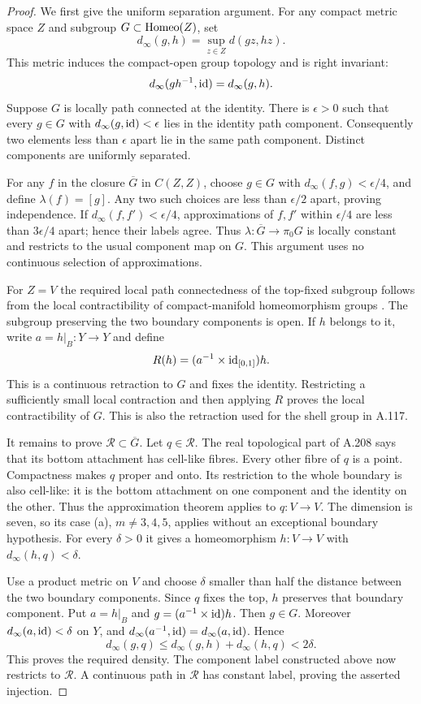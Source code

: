 \begin{proof}
We first give the uniform separation argument. For any compact
metric space $Z$ and subgroup $G\subset\operatorname{Homeo}(Z)$, set
\[
 d_\infty(g,h)=\sup_{z\in Z}d(gz,hz).
\]
This metric induces the compact-open group topology and is right
invariant:
\[
 d_\infty(gh^{-1},\operatorname{id})=d_\infty(g,h).
\]
Suppose $G$ is locally path connected at the identity. There is
$\epsilon>0$ such that every $g\in G$ with
$d_\infty(g,\operatorname{id})<\epsilon$ lies in the identity path component.
Consequently two elements less than $\epsilon$ apart lie in the
same path component. Distinct components are uniformly separated.

For any $f$ in the closure $\overline G$ in $C(Z,Z)$, choose
$g\in G$ with $d_\infty(f,g)<\epsilon/4$, and define
$\lambda(f)=[g]$. Any two such choices are less than
$\epsilon/2$ apart, proving independence. If
$d_\infty(f,f')<\epsilon/4$, approximations of $f,f'$ within
$\epsilon/4$ are less than $3\epsilon/4$ apart; hence their
labels agree. Thus $\lambda:\overline G\to\pi_0G$ is locally
constant and restricts to the usual component map on $G$.
This argument uses no continuous selection of approximations.

For $Z=V$ the required local path connectedness of the top-fixed
subgroup follows from the local contractibility of compact-manifold
homeomorphism groups
\cite[Corollary~1.1, p.~63]{EdwardsKirby1971}.
The subgroup preserving the two boundary components is open. If
$h$ belongs to it, write $a=h|_B:Y\to Y$ and define
\[
 R(h)=(a^{-1}\times\operatorname{id}_{[0,1]})h.
\]
This is a continuous retraction to $G$ and fixes the identity.
Restricting a sufficiently small local contraction and then applying
$R$ proves the local contractibility of $G$. This is also the
retraction used for the shell group in A.117.

It remains to prove $\mathcal R\subset\overline G$. Let
$q\in\mathcal R$. The real topological part of A.208 says that
its bottom attachment has cell-like fibres. Every other fibre of
$q$ is a point. Compactness makes $q$ proper and onto. Its
restriction to the whole boundary is also cell-like: it is the
bottom attachment on one component and the identity on the other.
Thus the approximation theorem
\cite[Theorem~A, p.~271]{Siebenmann1972Approximation} applies to
$q:V\to V$. The dimension is seven, so its case (a),
$m\ne3,4,5$, applies without an exceptional boundary hypothesis.
For every $\delta>0$ it gives a homeomorphism $h:V\to V$
with $d_\infty(h,q)<\delta$.

Use a product metric on $V$ and choose $\delta$ smaller than half
the distance between the two boundary components. Since $q$ fixes
the top, $h$ preserves that boundary component. Put
$a=h|_B$ and $g=(a^{-1}\times\operatorname{id})h$. Then $g\in G$.
Moreover $d_\infty(a,\operatorname{id})<\delta$ on $Y$, and
$d_\infty(a^{-1},\operatorname{id})=d_\infty(a,\operatorname{id})$. Hence
\[
 d_\infty(g,q)\leq d_\infty(g,h)+d_\infty(h,q)<2\delta.
\]
This proves the required density. The component label constructed
above now restricts to $\mathcal R$. A continuous path in
$\mathcal R$ has constant label, proving the asserted injection.


\end{proof}
